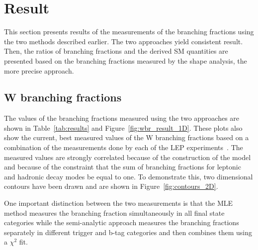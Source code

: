 \section{Result}
\label{sec:analysis:result}


This section presents results of the measurements of the branching
fractions using the two methods described earlier. 
The two approaches yield consistent result.
Then, the ratios of branching
fractions and the derived SM quantities are presented based on the branching
fractions measured by the shape analysis, the more precise approach.


\subsection{W branching fractions}
The values of the
branching fractions measured using the two approaches are shown in
Table~\ref{tab:results} and Figure~\ref{fig:wbr_result_1D}.  These plots
also show the current, best measured values of the W branching fractions
based on a combination of the measurements done by each of the LEP
experiments~\cite{Schael:2013ita}.  The measured values are strongly
correlated because of the construction of the model and because of the
constraint that the sum of branching fractions for leptonic and hadronic
decay modes be equal to one.  To demonstrate this, two dimensional
contours have been drawn and are shown in Figure~\ref{fig:contours_2D}.

One important distinction between the two measurements is that the MLE
method measures the branching fraction simultaneously in all final state
categories while the semi-analytic approach measures the branching fractions
separately in different trigger and b-tag categories and then combines
them using a $\chi^{2}$ fit.  

